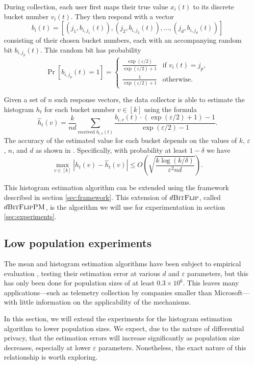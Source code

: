 \documentclass[a4paper,12pt]{article}
\renewcommand{\epsilon}{\varepsilon}
\begin{document}
During collection, each user first maps their true value $x_i(t)$ to its discrete bucket number $v_i(t)$. They then respond with a vector $$b_i(t)=\left[ (j_1, b_{i,j_1}(t)), (j_2, b_{i,j_2}(t)), \dots, (j_d, b_{i,j_d}(t)) \right]$$
consisting of their chosen bucket numbers, each with an accompanying random bit $b_{i,j_p}(t)$. This random bit has probability
$$\Pr[b_{i,j_p}(t)=1]=\begin{cases}
    \frac{\exp(\epsilon/2)}{\exp(\epsilon / 2) + 1} & \text{if } v_i(t) = j_p, \\
    \frac{1}{\exp(\epsilon/2) + 1} & \text{otherwise.}
\end{cases}$$

Given a set of $n$ such response vectors, the data collector is able to estimate the histogram $h_t$ for each bucket number $v \in [k]$ using the formula
\begin{equation*}
    \hat{h}_t(v) = \frac{k}{nd} \sum_{\text{received } b_{i,v}(t)} \frac{b_{i,v}(t)\cdot (\exp(\epsilon/2) + 1) - 1}{\exp(\epsilon/2) - 1}.
\end{equation*}
The accuracy of the estimated value for each bucket depends on the values of $k$, $\epsilon$, $n$, and $d$ as shown in \cite[sec.~2.2]{microsoft_telemetry}. Specifically, with probability at least $1 - \delta$ we have
$$
\max_{v \in [k]} |h_t(v) - \hat{h}_t(v)| \leq O\left( \sqrt{\frac{k \log(k/\delta)}{\epsilon^2nd}} \right).
$$ 

This histogram estimation algorithm can be extended using the framework described in section \ref{sec:framework}. This extension of $d\textsc{BitFlip}$, called $d\textsc{BitFlipPM}$, is the algorithm we will use for experimentation in section \ref{sec:experiments}.

\subsection{Low population experiments \label{sec:experiments}}

The mean and histogram estimation algorithms have been subject to empirical evaluation \cite[sec.~5]{microsoft_telemetry}, testing their estimation error at various $d$ and $\epsilon$ parameters, but this has only been done for population sizes of at least $0.3\times 10^6$. This leaves many applications---such as telemetry collection by companies smaller than Microsoft---with little information on the applicability of the mechanisms.

In this section, we will extend the experiments for the histogram estimation algorithm to lower population sizes. We expect, due to the nature of differential privacy, that the estimation errors will increase significantly as population size decreases, especially at lower $\epsilon$ parameters. Nonetheless, the exact nature of this relationship is worth exploring.
\end{document}
